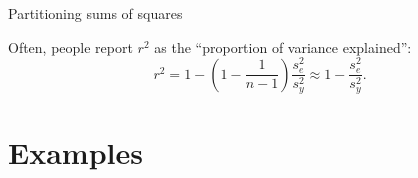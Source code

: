 \begin{frame}{Partitioning sums of squares}

    Often, people report $r^2$ as the ``\alert{proportion of variance explained}'':
    \[
        r^2 = 1 - (1-\frac{1}{n-1}) \frac{s_e^2}{s_y^2} \approx 1 - \frac{s_e^2}{s_y^2}.
    \]

    \pause




\end{frame}


\section{Examples}

